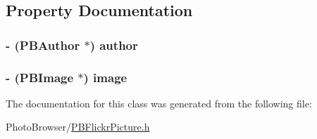 \subsection{Property Documentation}
\hypertarget{interface_p_b_flickr_picture_af262e29a252b8ee672fa7bafb4f1168a}{
\subsubsection[{author}]{\setlength{\rightskip}{0pt plus 5cm}-\/ ({\bf PBAuthor} $\ast$) author}}
\label{interface_p_b_flickr_picture_af262e29a252b8ee672fa7bafb4f1168a}
\hypertarget{interface_p_b_flickr_picture_af302f7b0dab3ec4ef87f21c52d431152}{
\subsubsection[{image}]{\setlength{\rightskip}{0pt plus 5cm}-\/ ({\bf PBImage} $\ast$) image}}
\label{interface_p_b_flickr_picture_af302f7b0dab3ec4ef87f21c52d431152}


The documentation for this class was generated from the following file:\begin{DoxyCompactItemize}
\item 
PhotoBrowser/\hyperlink{_p_b_flickr_picture_8h}{PBFlickrPicture.h}\end{DoxyCompactItemize}
